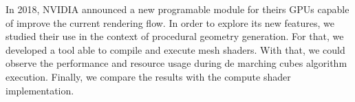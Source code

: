 In 2018, NVIDIA announced a new programable module for theirs GPUs capable of improve the current rendering flow. In order to explore its new features, we studied their use in the context of procedural geometry generation. For that, we developed a tool able to compile and execute mesh shaders. With that, we could observe the performance and resource usage during de marching cubes algorithm execution. Finally, we compare the results with the compute shader implementation.